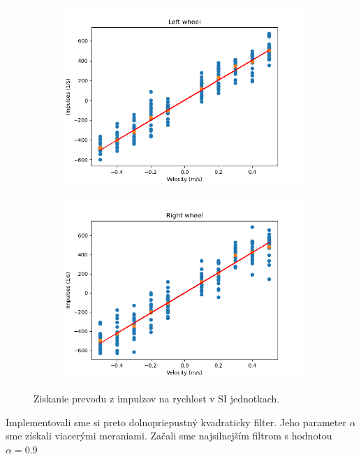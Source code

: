 \begin{figure}[!htbp]
	\begin{subfigure}{0.5\textwidth}
		\includegraphics[width=\textwidth]{img/lw_nf.png}
	\end{subfigure}
	\hfill
	\begin{subfigure}{0.5\textwidth}
		\includegraphics[width=\textwidth]{img/rw_nf.png}
	\end{subfigure}
	\caption{Ziskanie prevodu z impulzov na rychlost v SI jednotkach.}
	\label{fig:rw_lw_nf}
\end{figure}

Implementovali sme si preto dolnopriepustný kvadraticky filter. Jeho parameter \(\alpha\) sme získali viacerými meraniami. Začali sme
najsilnejším filtrom s hodnotou \(\alpha =  0.9\)

